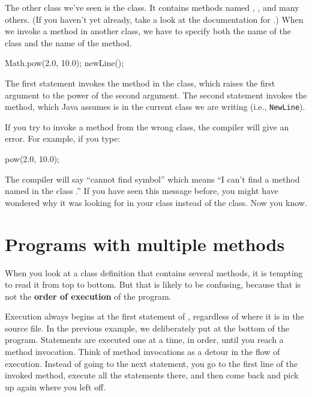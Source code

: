 The other class we've seen is the  class.
It contains methods named , , and many others.
(If you haven't yet already, take a look at the documentation for .)
When we invoke a method in another class, we have to specify both the name of the class and the name of the method.

\begin{code}
    Math.pow(2.0, 10.0);
    newLine();
\end{code}

The first statement invokes the  method in the  class, which raises the first argument to the power of the second argument.
The second statement invokes the  method, which Java assumes is in the current class we are writing (i.e., {\tt NewLine}).

If you try to invoke a method from the wrong class, the compiler will give an error.
For example, if you type:

\begin{code}
    pow(2.0, 10.0);
\end{code}

The compiler will say ``cannot find symbol'' which means ``I can't find a method named  in the class .''
If you have seen this message before, you might have wondered why it was looking for  in your class instead of the  class.
Now you know.


\section{Programs with multiple methods}


When you look at a class definition that contains several methods, it is tempting to read it from top to bottom.
But that is likely to be confusing, because that is not the {\bf order of execution} of the program.

Execution always begins at the first statement of , regardless of where it is in the source file.
In the previous example, we deliberately put  at the bottom of the program.
Statements are executed one at a time, in order, until you reach a method invocation.
Think of method invocations as a detour in the flow of execution.
Instead of going to the next statement, you go to the first line of the invoked method, execute all the statements there, and then come back and pick up again where you left off.

